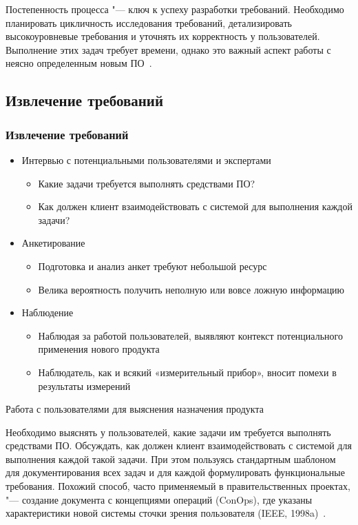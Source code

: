 \documentclass{../industrial-development}
\begin{document}
Постепенность процесса "--- ключ к успеху разработки требований. Необходимо планировать цикличность исследования требований, детализировать высокоуровневые требования и уточнять их корректность у пользователей. Выполнение этих задач требует времени, однако это важный аспект работы с неясно определенным новым ПО~\cite[с.~12-13]{Wiegers}.


\subsection{Извлечение требований}
\begin{frame} \frametitle{Извлечение требований}
\begin{itemize}

\item \alert{Интервью с потенциальными пользователями и экспертами}
\begin{itemize} 
\item Какие задачи требуется выполнять средствами ПО? 
\item Как должен клиент взаимодействовать с
системой для выполнения каждой задачи? 
\end{itemize}

\item \alert{Анкетирование}
\begin{itemize} 
\item Подготовка и анализ анкет требуют небольшой ресурс
\item Велика вероятность получить неполную или вовсе ложную информацию
\end{itemize}

\item \alert{Наблюдение}
\begin{itemize} 
\item Наблюдая за работой пользователей, выявляют контекст потенциального применения нового продукта
\item Наблюдатель, как и всякий «измерительный прибор», вносит помехи в результаты измерений
\end{itemize} 

\end{itemize}
\end{frame}

\lecturenotes

\alert{Работа с пользователями для выяснения назначения продукта}

Необходимо выяснять у пользователей, какие задачи им требуется выполнять средствами ПО. Обсуждать, как должен клиент взаимодействовать с системой для выполнения каждой такой задачи. При этом пользуясь стандартным шаблоном для документирования всех задач и для каждой формулировать функциональные требования. Похожий способ, часто применяемый в правительственных проектах, "--- создание документа с концепциями операций (ConOps), где указаны характеристики новой системы сточки зрения пользователя (IEEE, 1998a)~\cite[с.~46]{Wiegers}.
\end{document}
